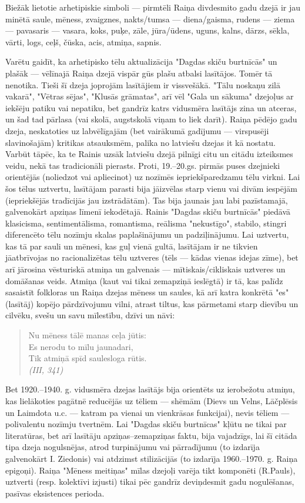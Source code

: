 \documentclass[11pt]{article}
\begin{document}
Biežāk lietotie arhetipiskie simboli --- pirmtēli
Raiņa divdesmito gadu dzejā ir jau minētā saule,
mēness, zvaigznes, nakts/tumsa --- diena/gaisma,
rudens ---  ziema --- pavasaris --- vasara, koks,
puķe, zāle, jūra/ūdens, uguns, kalns, dārzs, sēkla,
vārti, logs, ceļš, čūska, acis, atmiņa, sapnis.

Varētu gaidīt, ka arhetipisko tēlu aktualizācija
"Dagdas skiču burtnīcās" un plašāk --- vēlīnajā Raiņa
dzejā vispār gūs plašu atbalsi lasītājos.
Tomēr tā nenotika. Tieši šī dzeja joprojām lasītājiem
ir vissvešākā. "Tālu noskaņu zilā vakarā",
"Vētras sējas", "Klusās grāmatas", arī vēl
"Gala un sākuma" dzejoļus ar iekšēju patiku vai nepatiku,
bet gandrīz katrs vidusmēra lasītājs zina un atceras,
un šad tad pārlasa (vai skolā, augstskolā viņam
to liek darīt). Raiņa pēdējo gadu dzeja, neskatoties
uz labvēlīgajām (bet vairākumā gadījumu --- virspusēji
slavinošajām) kritikas atsauksmēm, palika no latviešu
dzejas it kā nostatu. Varbūt tāpēc, ka te Rainis uzsāk
latviešu dzejā pilnīgi citu un citādu izteiksmes veidu, nekā
tas tradicionāli pierasts. Proti, 19.--20.gs.
pirmās puses dzejnieki orientējās (noliedzot vai
apliecinot) uz nozīmēs iepriekšparedzamu tēlu virkni.
Lai šos tēlus uztvertu, lasītājam parasti bija jāizvēlas
starp vienu vai divām iespējām (iepriekšējās tradīcijās
jau izstrādātām). Tas bija jaunais jau labi pazīstamajā,
galvenokārt apziņas līmenī iekodētajā.
Rainis "Dagdas skiču burtnīcās" piedāvā klasicisma,
sentimentālisma, romantisma, reālisma "nekustīgo",
stabilo, stingri diferencēto tēlu nozīmju skalas
paplašinājumu un padziļinājumu.
Lai uztvertu, kas tā par sauli un mēnesi, kas guļ vienā
gultā, lasītājam ir ne tikvien jāatbrīvojas no racionalizētas
tēlu uztveres (tēls --- kādas vienas idejas zīme), bet arī
jārosina vēsturiskā atmiņa un galvenais --- mītiskais/cikliskais
uztveres un domāšanas veids. Atmiņa (kaut vai tikai
zemapziņā ieslēgtā) ir tā, kas palīdz sasaistīt
folkloras un Raiņa dzejas mēness un saules, kā arī
katra konkrētā "es" (lasītāj) kopējo pārdzīvojumu vilni,
atrast tiltus, kas pārmetami starp dievību un cilvēku,
svešu un savu mīlestību, dzīvi un nāvi:

\begin{quote}
Nu mēness tālē manas ceļa jūtis:\\
Es nerodu to mīlu jaunadari,\\
Tik atmiņā spīd saulesloga rūtis.\\
{\em (III, 341)}
\end{quote}

Bet 1920.--1940. g. vidusmēra dzejas lasītājs bija
orientēts uz ierobežotu atmiņu, kas lielākoties
pagātnē reducējās uz tēliem --- shēmām (Dievs un
Velns, Lāčplēsis un Laimdota u.c. --- katram pa
vienai un vienkrāsas funkcijai), nevis tēliem ---
polivalentu nozīmju tvertnēm. Lai "Dagdas skiču
burtnīcas" kļūtu ne tikai par literatūras, bet arī
lasītāju apziņas--zemapziņas faktu, bija vajadzīgs,
lai šī citāda tipa dzeja nogulsnējas, atrod turpinājumu
vai pārradījumu (to izdarīja galvenokārt I. Ziedonis)
vai atdzimst stilizācijās (to izdarīja 1960.--1970. g.
Raiņa epigoņi). Raiņa "Mēness meitiņas" mīlas
dzejoļi varēja tikt komponēti (R.Pauls), uztverti
(resp. kolektīvi izjusti) tikai pēc gandrīz
deviņdesmit gadu nogulēšanas, pasīvas eksistences
perioda.
\end{document}
